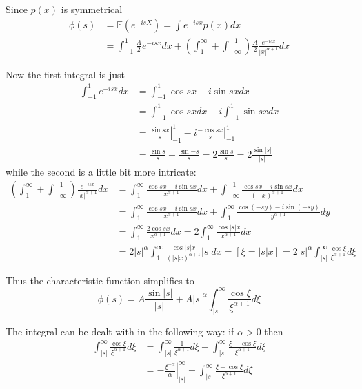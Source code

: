 \documentclass[a4paper]{article}
\newcommand{\clo}[1]{{\left [ #1 \right ]}}
\newcommand{\brac}[1]{{\left ( #1 \right )}}
\newcommand{\induc}[1]{{\left . #1 \right \vert}}
\newcommand{\abs}[1]{{\left | #1 \right |}}
\newcommand{\Ex}{\mathbb{E}}
\begin{document}
Since $p(x)$ is symmetrical
\begin{align*}
	\phi(s) &= \Ex\brac{e^{-isX} } = \int e^{-isx}p(x)dx \\
	&= \int_{-1}^1 \frac{A}{2} e^{-isx} dx + \brac{\int_1^\infty + \int_{-\infty}^{-1}} \frac{A}{2} \frac{e^{-isx} }{\abs{x}^{\alpha+1}} dx
\end{align*}

Now the first integral is just \begin{align*}
	\int_{-1}^1 e^{-isx} dx &= \int_{-1}^1 \cos{sx} -i\sin{sx} dx \\ 
	&= \int_{-1}^1 \cos{sx} dx - i \int_{-1}^1 \sin{sx} dx \\
	& =  \induc{\frac{\sin{sx}}{s}}_{-1}^1 - i \induc{\frac{-\cos{sx}}{s}}_{-1}^1\\
	& = \frac{\sin{s}}{s}-\frac{\sin{-s}}{s} = 2 \frac{\sin{s}}{s} = 2 \frac{\sin\abs{s}}{\abs{s}}
\end{align*}
while the second is a little bit more intricate:
\begin{align*}
	\brac{\int_1^\infty + \int_{-\infty}^{-1}} \frac{e^{-isx} }{\abs{x}^{\alpha+1}} dx
	&= \int_1^\infty \frac{\cos{sx}-i\sin{sx}}{x^{\alpha+1}} dx + \int_{-\infty}^{-1} \frac{\cos{sx}-i\sin{sx}}{\brac{-x}^{\alpha+1}} dx \\
	&= \int_1^\infty \frac{\cos{sx}-i\sin{sx}}{x^{\alpha+1}} dx + \int_1^\infty \frac{\cos(-sy)-i\sin(-sy)}{y^{\alpha+1}} dy \\
	&= \int_1^\infty \frac{2\cos{sx}}{x^{\alpha+1}} dx = 2\int_1^\infty \frac{\cos{\abs{s}x}}{x^{\alpha+1}} dx \\
	& = 2\abs{s}^\alpha \int_1^\infty \frac{\cos{\abs{s}x}}{\brac{\abs{s}x}^{\alpha+1}} \abs{s}dx = \clo{\xi = \abs{s}x} = 2\abs{s}^\alpha \int_{\abs{s}}^\infty \frac{\cos \xi}{\xi^{\alpha+1}} d\xi
\end{align*}

Thus the characteristic function simplifies to
\[\phi(s) = A \frac{\sin\abs{s}}{\abs{s}} + A \abs{s}^\alpha \int_{\abs{s}}^\infty \frac{\cos \xi}{\xi^{\alpha+1}} d\xi \]

The integral can be dealt with in the following way: if $\alpha>0$ then \begin{align*}
	\int_{\abs{s}}^\infty \frac{\cos \xi}{\xi^{\alpha+1}} d\xi & = 
	\int_{\abs{s}}^\infty \frac{1}{\xi^{\alpha+1}} d\xi - \int_{\abs{s}}^\infty \frac{\xi - \cos\xi}{\xi^{\alpha+1}} d\xi\\
	& = \induc{-\frac{\xi^{-\alpha}}{\alpha}}_{\abs{s}}^\infty - \int_{\abs{s}}^\infty \frac{\xi - \cos\xi}{\xi^{\alpha+1}} d\xi
\end{align*}
\end{document}
